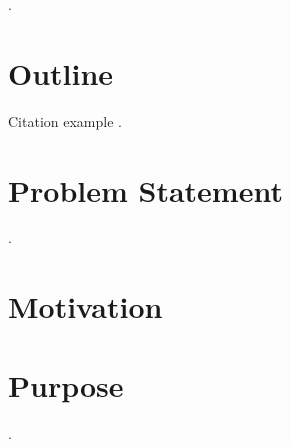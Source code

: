 \par \lipsum.

\section{Outline}
Citation example \cite{mansouri2008named}.

\lipsum

\section{Problem Statement}
\lipsum.

\section{Motivation}
\lipsum

\section{Purpose}
\lipsum.


